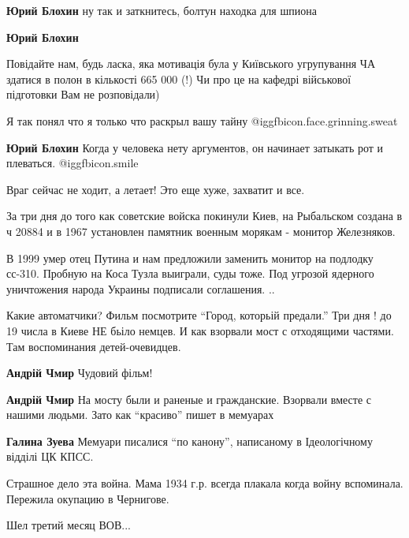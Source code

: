 \begin{itemize}
\begin{itemize}
\textbf{Юрий Блохин} ну так и заткнитесь, болтун находка для шпиона

\textbf{Юрий Блохин} 

Повідайте нам, будь ласка, яка мотивація була у Київського угрупування ЧА
здатися в полон в кількості 665 000 (!) Чи про це на кафедрі військової
підготовки Вам не розповідали)

Я так понял что я только что раскрыл вашу тайну  @igg{fbicon.face.grinning.sweat} 

\textbf{Юрий Блохин} Когда у человека нету аргументов, он начинает затыкать рот и плеваться.  @igg{fbicon.smile} 
\end{itemize} %

Враг сейчас не ходит, а летает! Это еще хуже, захватит и все.


За три дня до того как советские войска покинули Киев, на Рыбальском создана в
ч 20884 и в 1967 установлен памятник военным морякам - монитор Железняков.

В 1999 умер отец Путина и нам предложили заменить монитор на подлодку сс-310.
Пробную на Коса Тузла выиграли, суды тоже. Под угрозой ядерного уничтожения
народа Украины подписали соглашения. ..



Какие автоматчики? Фильм посмотрите \enquote{Город, которьій предали.} Три дня ! до 19
числа в Киеве НЕ бьіло немцев. И как взорвали мост с отходящими частями. Там
воспоминания детей-очевидцев.

\begin{itemize} %
\textbf{Андрій Чмир} Чудовий фільм!

\textbf{Андрій Чмир} На мосту были и раненые и гражданские. Взорвали вместе с нашими людьми. Зато как \enquote{красиво} пишет в мемуарах

\textbf{Галина Зуева} Мемуари писалися \enquote{по канону}, написаному в Ідеологічному відділі ЦК КПСС.
\end{itemize} %

Страшное дело эта война. Мама 1934 г.р. всегда плакала когда войну вспоминала.
Пережила окупацию в Чернигове.

Шел третий месяц ВОВ...


\end{itemize}
